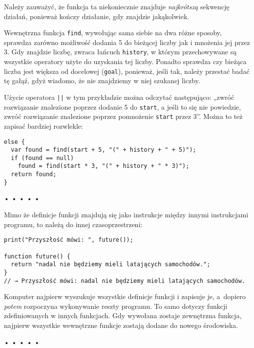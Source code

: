Należy zauważyć, że funkcja ta niekoniecznie znajduje \emph{najkrótszą} sekwencję działań, ponieważ kończy działanie, gdy znajdzie jakąkolwiek.

    
Wewnętrzna funkcja \texttt{find}, wywołując sama siebie na dwa różne sposoby, sprawdza zarówno możliwość dodania 5 do bieżącej liczby jak i mnożenia jej przez 3. Gdy znajdzie liczbę, zwraca łańcuch \texttt{history}, w którym przechowywane są wszystkie operatory użyte do uzyskania tej liczby. Ponadto sprawdza czy bieżąca liczba jest większa od docelowej (\texttt{goal}), ponieważ, jeśli tak, należy przestać badać tę gałąź, gdyż wiadomo, że nie znajdziemy w niej szukanej liczby.

    
Użycie operatora \texttt{||} w tym przykładzie można odczytać następująco: „zwróć rozwiązanie znalezione poprzez dodanie 5 do \texttt{start}, a jeśli to się nie powiedzie, zwróć rozwiązanie znalezione poprzez pomnożenie \texttt{start} przez 3”. Można to też zapisać bardziej rozwlekle:

    
\begin{verbatim} 
else {
  var found = find(start + 5, "(" + history + " + 5)");
  if (found == null)
    found = find(start * 3, "(" + history + " * 3)");
  return found;
}
 \end{verbatim}
  
  
\begin{center}
• • • • •
\end{center}
  
    
Mimo że definicje funkcji znajdują się jako instrukcje między innymi instrukcjami programu, to należą do innej czasoprzestrzeni:

    
\begin{verbatim} 
print("Przyszłość mówi: ", future());

function future() {
  return "nadal nie będziemy mieli latających samochodów.";
}
// → Przyszłość mówi: nadal nie będziemy mieli latających samochodów.
\end{verbatim}
    
Komputer najpierw wyszukuje wszystkie definicje funkcji i zapisuje je, a~dopiero \emph{potem} rozpoczyna wykonywanie reszty programu. To samo dotyczy funkcji zdefiniowanych w innych funkcjach. Gdy wywołana zostaje zewnętrzna funkcja, najpierw wszystkie wewnętrzne funkcje zostają dodane do nowego środowiska.

  
  
\begin{center}
• • • • •
\end{center}
  
